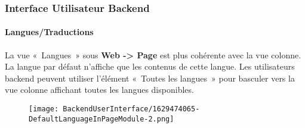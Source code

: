 %

\begin{frame}[fragile]
	\frametitle{Interface Utilisateur Backend}
	\framesubtitle{Langues/Traductions}

	La vue «~Langues~» sous \textbf{Web -> Page} est plus cohérente avec la vue colonne.
	La langue par défaut n'affiche que les contenus de cette langue.
	Les utilisateurs backend peuvent utiliser l'élément «~Toutes les langues~» pour basculer
	vers la vue colonne affichant toutes les langues disponibles.

	\begin{figure}
		\texttt{[image: BackendUserInterface/1629474065-DefaultLanguageInPageModule-2.png]}
	\end{figure}

\end{frame}

